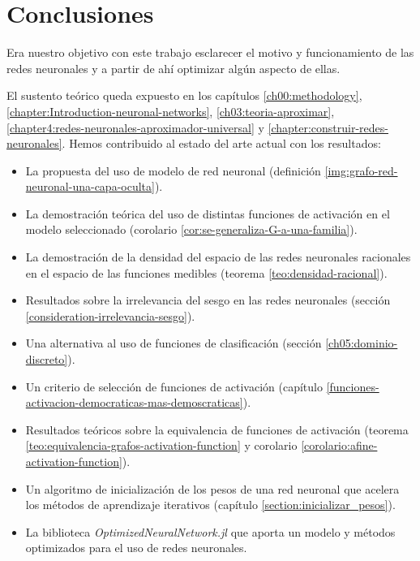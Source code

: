 
\chapter{Conclusiones} 
\label{ch09:conclusion}
Era nuestro objetivo con este trabajo esclarecer 
el motivo y funcionamiento de las redes neuronales y 
a partir de ahí optimizar algún aspecto de ellas. 

El sustento teórico queda expuesto en los capítulos 
\ref{ch00:methodology}, \ref{chapter:Introduction-neuronal-networks},
\ref{ch03:teoria-aproximar}, \ref{chapter4:redes-neuronales-aproximador-universal}
y \ref{chapter:construir-redes-neuronales}. 
Hemos contribuido al estado del arte actual con los 
resultados: 

\begin{itemize}
    \item La propuesta del uso de modelo de red neuronal (definición \ref{img:grafo-red-neuronal-una-capa-oculta}).
    \item La demostración teórica del uso de distintas funciones de activación en 
    el modelo seleccionado (corolario \ref{cor:se-generaliza-G-a-una-familia}). 
    \item La demostración de la densidad del espacio de las redes neuronales racionales en el espacio de las funciones medibles (teorema \ref{teo:densidad-racional}).
    \item Resultados sobre la irrelevancia del sesgo en las redes neuronales (sección \ref{consideration-irrelevancia-sesgo}).
    \item Una alternativa al uso de funciones de clasificación (sección \ref{ch05:dominio-discreto}).
    \item Un criterio de selección de funciones de activación (capítulo \ref{funciones-activacion-democraticas-mas-demoscraticas}).
    \item Resultados teóricos sobre la equivalencia de funciones de activación (teorema \ref{teo:equivalencia-grafos-activation-function} y 
    corolario \ref{corolario:afine-activation-function}).
    \item Un algoritmo de inicialización de los pesos de una red neuronal que acelera los métodos de aprendizaje iterativos (capítulo \ref{section:inicializar_pesos}).
    \item La biblioteca \textit{OptimizedNeuralNetwork.jl} que aporta un modelo y métodos optimizados para el uso de redes neuronales. 
\end{itemize}

